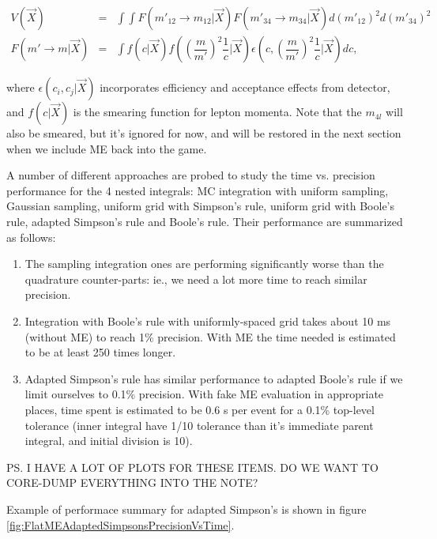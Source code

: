 \documentclass{cmspaper}
\begin{document}
\begin{eqnarray}
V(\vec{X}) &=& \int\int F(m'_{12} \rightarrow m_{12} | \vec{X}) F(m'_{34} \rightarrow m_{34} | \vec{X}) d (m'_{12})^2 d (m'_{34})^2\\
F(m' \rightarrow m | \vec{X}) &=& \int f(c | \vec{X}) f\left(\left(\dfrac{m}{m'}\right)^2 \dfrac{1}{c}|\vec{X}\right) \epsilon\left(c, \left(\dfrac{m}{m'}\right)^2 \dfrac{1}{c} | \vec{X}\right) d c,
\end{eqnarray}

where $\epsilon(c_i, c_j | \vec{X})$ incorporates efficiency and acceptance effects from detector,
and $f(c | \vec{X})$ is the smearing function for lepton momenta.  Note that the $m_{4l}$ will also be
smeared, but it's ignored for now, and will be restored in the next section when we include ME back into the game.

A number of different approaches are probed to study the time vs. precision performance for the 4 nested integrals:
MC integration with uniform sampling, Gaussian sampling, uniform grid with Simpson's rule, uniform grid with
Boole's rule, adapted Simpson's rule and Boole's rule.  Their performance are summarized as follows:

\begin{enumerate}
\item The sampling integration ones are performing significantly worse than the quadrature counter-parts: ie.,
   we need a lot more time to reach similar precision.
\item Integration with Boole's rule with uniformly-spaced grid takes about 10 ms (without ME) to reach 1\% precision.
   With ME the time needed is estimated to be at least 250 times longer.
\item Adapted Simpson's rule has similar performance to adapted Boole's rule if we limit ourselves to 0.1\% precision.
   With fake ME evaluation in appropriate places, time spent is estimated to be 0.6 s per event for a 0.1\%
   top-level tolerance (inner integral have 1/10 tolerance than it's immediate parent integral, and initial
   division is 10).
\end{enumerate}

PS. I HAVE A LOT OF PLOTS FOR THESE ITEMS.  DO WE WANT TO CORE-DUMP EVERYTHING INTO THE NOTE?

Example of performace summary for adapted Simpson's is shown in figure \ref{fig:FlatMEAdaptedSimpsonsPrecisionVsTime}.
\end{document}
